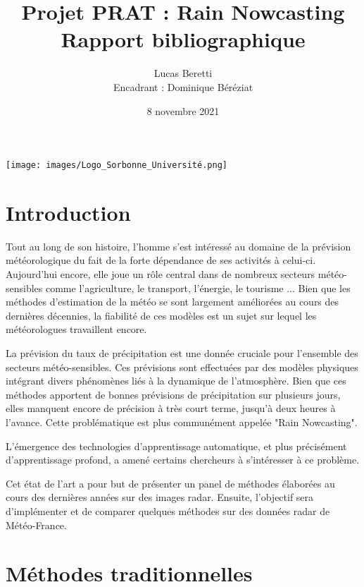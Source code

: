 \documentclass[12pt,a4paper,french]{article}
\title{\LARGE{Projet PRAT : Rain Nowcasting} \\ [0.25cm]\large{Rapport bibliographique} \\ [2cm]}
\author{Lucas Beretti \\ [0.5cm]Encadrant : Dominique Béréziat \\ [2cm]}
\date{8 novembre 2021}
\newcommand\secspacing{1.5cm}
\begin{document}
\maketitle

\vspace{5cm}
\begin{center}
    \texttt{[image: images/Logo\_Sorbonne\_Université.png]}
\end{center}

\newpage

\tableofcontents

\newpage

\section{Introduction}

Tout au long de son histoire, l'homme s'est intéressé au domaine de la prévision météorologique du fait de la forte dépendance de ses activités à celui-ci. Aujourd'hui encore, elle joue un rôle central dans de nombreux secteurs météo-sensibles comme l'agriculture, le transport, l'énergie, le tourisme ... Bien que les méthodes d'estimation de la météo se sont largement améliorées au cours des dernières décennies, la fiabilité de ces modèles est un sujet sur lequel les météorologues travaillent encore.

La prévision du taux de précipitation est une donnée cruciale pour l'ensemble des secteurs météo-sensibles. Ces prévisions sont effectuées par des modèles physiques intégrant divers phénomènes liés à la dynamique de l'atmosphère. Bien que ces méthodes apportent de bonnes prévisions de précipitation sur plusieurs jours, elles manquent encore de précision à très court terme, jusqu'à deux heures à l'avance. Cette problématique est plus communément appelée "Rain Nowcasting".

L'émergence des technologies d'apprentissage automatique, et plus précisément d'apprentissage profond, a amené certains chercheurs à s'intéresser à ce problème. 

Cet état de l'art a pour but de présenter un panel de méthodes élaborées au cours des dernières années sur des images radar. Ensuite, l'objectif sera d'implémenter et de comparer quelques méthodes sur des données radar de Météo-France. 

\vspace{\secspacing}

\section{Méthodes traditionnelles}
\end{document}
